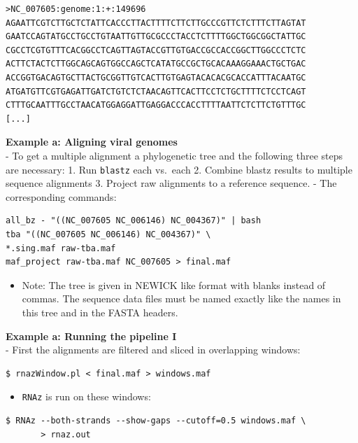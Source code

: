 \documentclass[]{article}
\providecommand{\tightlist}{%
  \setlength{\itemsep}{0pt}\setlength{\parskip}{0pt}}
\begin{document}

\begin{verbatim}
>NC_007605:genome:1:+:149696
AGAATTCGTCTTGCTCTATTCACCCTTACTTTTCTTCTTGCCCGTTCTCTTTCTTAGTAT
GAATCCAGTATGCCTGCCTGTAATTGTTGCGCCCTACCTCTTTTGGCTGGCGGCTATTGC
CGCCTCGTGTTTCACGGCCTCAGTTAGTACCGTTGTGACCGCCACCGGCTTGGCCCTCTC
ACTTCTACTCTTGGCAGCAGTGGCCAGCTCATATGCCGCTGCACAAAGGAAACTGCTGAC
ACCGGTGACAGTGCTTACTGCGGTTGTCACTTGTGAGTACACACGCACCATTTACAATGC
ATGATGTTCGTGAGATTGATCTGTCTCTAACAGTTCACTTCCTCTGCTTTTCTCCTCAGT
CTTTGCAATTTGCCTAACATGGAGGATTGAGGACCCACCTTTTAATTCTCTTCTGTTTGC
[...]
\end{verbatim}

\textbf{Example a: Aligning viral genomes}\\
- To get a multiple alignment a phylogenetic tree and the following
three steps are necessary: 1. Run \texttt{blastz} each vs.~each 2.
Combine blastz results to multiple sequence alignments 3. Project raw
alignments to a reference sequence. - The corresponding commands:

\begin{verbatim}
all_bz - "((NC_007605 NC_006146) NC_004367)" | bash
tba "((NC_007605 NC_006146) NC_004367)" \
*.sing.maf raw-tba.maf
maf_project raw-tba.maf NC_007605 > final.maf
\end{verbatim}

\begin{itemize}
\tightlist
\item
  Note: The tree is given in NEWICK like format with blanks instead of
  commas. The sequence data files must be named exactly like the names in
  this tree and in the FASTA headers.
\end{itemize}

\textbf{Example a: Running the pipeline I}\\
- First the alignments are filtered and sliced in overlapping windows:

\begin{verbatim}
$ rnazWindow.pl < final.maf > windows.maf
\end{verbatim}

\begin{itemize}
\tightlist
\item
  \texttt{RNAz} is run on these windows:
\end{itemize}

\begin{verbatim}
$ RNAz --both-strands --show-gaps --cutoff=0.5 windows.maf \
       > rnaz.out
\end{verbatim}
\end{document}
